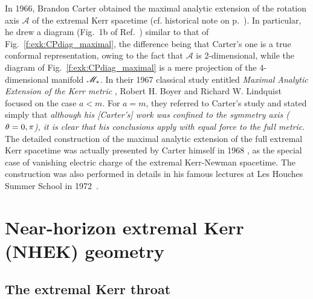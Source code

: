 \begin{hist}
In 1966, Brandon Carter \cite{Carte66} obtained the maximal analytic extension
of the rotation axis $\mathscr{A}$ of the extremal Kerr spacetime (cf. historical note on p.~\pageref{h:ker:max_ext_diag}). In particular, he drew a diagram (Fig.~1b of Ref.~\cite{Carte66})
similar to that of Fig.~\ref{f:exk:CPdiag_maximal}, the difference
being that Carter's one is a true conformal representation, owing to the fact
that $\mathscr{A}$ is 2-dimensional, while the diagram of Fig.~\ref{f:exk:CPdiag_maximal}
is a mere projection of the 4-dimensional manifold $\mathscr{M}_*$.
In their 1967 classical study entitled \emph{Maximal Analytic Extension of the Kerr metric}
\cite{BoyerL67},
Robert H. Boyer and Richard W. Lindquist
focused on the case $a<m$. For $a=m$, they referred to Carter's study \cite{Carte66}
and stated simply that
\emph{although his
\emph{[Carter's]} work was confined to the symmetry axis ($\theta=0,\pi$), it is clear
that his conclusions apply with equal force to the full metric}.
The detailed construction of the maximal analytic extension
of the full extremal Kerr spacetime was actually presented by Carter himself
in 1968 \cite{Carte68a}, as the special case of vanishing electric charge
of the extremal Kerr-Newman spacetime.
The construction was also performed in details in his famous lectures at Les Houches
Summer School in 1972~\cite{Carte73a}.
\end{hist}



\section{Near-horizon extremal Kerr (NHEK) geometry} \label{s:exk:NHEK}

\subsection{The extremal Kerr throat} \label{s:exk:throat}

